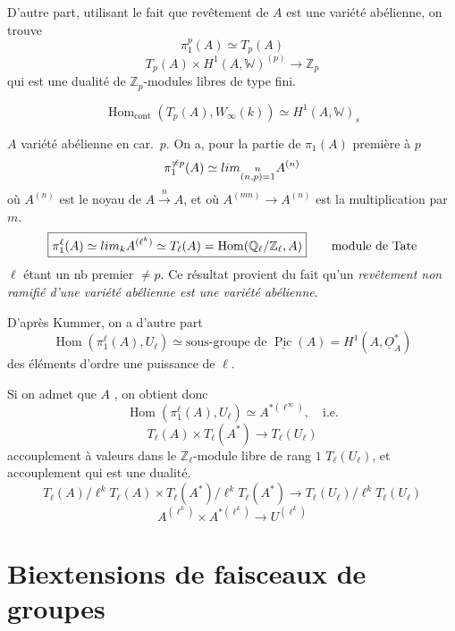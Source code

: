 \documentclass[11pt,a4paper]{article}
\begin{document}
D'autre part, utilisant \ill{} le fait que  revêtement de $A$ est
une variété abélienne, on trouve 
\[
\boxed{\pi_1^p(A) \simeq T_p(A)}
\]
 \ill{} 
\[
\boxed{T_p(A) \times H^1(A, \mathbb{W})^{(p)} \longrightarrow \mathbb{Z}_p}
\]
qui est une dualité de $\mathbb{Z}_p$-modules libres de type fini.

  \ill{} 
\[
\boxed{\operatorname{Hom}_{\mathrm{cont}}(T_p(A), W_\infty(k)) \simeq H^1(A,
\mathbb{W})_s}
\]


$A$ variété abélienne en car.\ $p$. On a, pour la partie de $\pi_1(A)$ première à
$p$
\[
\pi_1^{\neq p}(A) \simeq \varprojlim_{\substack{n \\ (n,p)=1}} A^{(n)}
\]
où $A^{(n)}$ est le noyau de $A \xrightarrow{\ n\ } A$, et où $A^{(mn)} \to A^{(n)}$
est la multiplication par $m$.
\[
\boxed{\pi_1^{\ell}(A) \simeq \varprojlim_{k} A^{(\ell^k)} \simeq T_\ell(A) =
\operatorname{Hom}(\mathbb{Q}_\ell/\mathbb{Z}_\ell, A)}
\qquad \text{module de Tate}
\]
$\ell$ étant un nb premier $\neq p$. Ce résultat provient du fait qu'un
\emph{revêtement non ramifié d'une variété abélienne est une variété abélienne}.

D'après Kummer, on a d'autre part
\struck{\ill{}}
\[
\operatorname{Hom}(\pi_1^{\ell}(A), U_\ell) \simeq
\text{sous-groupe de } \underline{\operatorname{Pic}}(A) = H^1(A,
\underline{O}_A^*)
\]
des éléments d'ordre une puissance de $\ell$.

Si on admet que $A$ \ill{} \emph{}, on obtient donc
\[
\operatorname{Hom}(\pi_1^{\ell}(A), U_\ell) \simeq A^{*(\ell^\infty)}, \quad
\text{i.e.}
\]
\[
\boxed{T_\ell(A) \times T_\ell(A^*) \longrightarrow T_\ell(U_\ell)}
\]
accouplement à valeurs dans le $\mathbb{Z}_\ell$-module libre de rang $1$
$T_\ell(U_\ell)$, et accouplement qui est une dualité.
\[
T_\ell(A)/\ell^k T_\ell(A) \times T_\ell(A^*)/\ell^k T_\ell(A^*) \longrightarrow
T_\ell(U_\ell)/\ell^k T_\ell(U_\ell)
\]
\[
A^{(\ell^k)} \times A^{*(\ell^k)} \longrightarrow U^{(\ell^k)}
\]

\section*{Biextensions de faisceaux de groupes}

\end{document}
